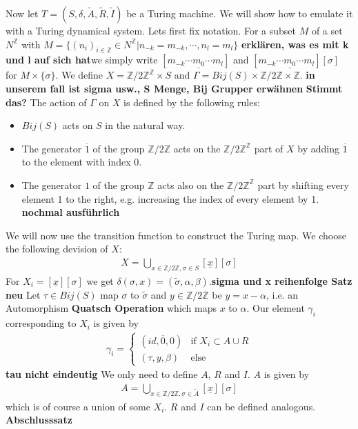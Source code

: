 \documentclass[12pt,a4paper]{scrartcl}
\numberwithin{equation}{section}
\newcommand{\Z}{\mathbb{Z}} %
\newcommand{\2}{\mathbb{Z} / 2 \mathbb{Z}}
\begin{document}
Now let  $T=(S,\delta, \tilde{A}, \tilde{R}, \tilde{I})$ be a Turing machine. We will show how to emulate it with a Turing dynamical system. Lets first fix notation. For a subset $M$ of a set $N^\Z$ with $M = \{(n_i)_{i \in \Z} \in N^\Z | n_{-k} = m_{-k}, \cdots, n_l = m_l \}$ \textbf{erklären, was es mit k und l auf sich hat}we simply write $[m_{-k} \cdots \underline{m_0} \cdots m_l]$ and $[m_{-k} \cdots \underline{m_0} \cdots m_l][\sigma]$ for $M \times \{\sigma\}$. We define $X = \2^\Z \times S$ and $\Gamma = Bij(S) \times \2 \times \Z$. \textbf{in unserem fall ist sigma usw., S Menge, Bij Grupper erwähnen}
\textbf{Stimmt das?}
The action of $\Gamma$ on $X$ is defined by the following rules:
\begin{itemize}
	\item $Bij(S)$ acts on $S$ in the natural way.
	\item The generator $\overline{1}$ of the group $\Z / 2\Z$ acts on the $\Z / 2\Z^\Z$ part of $X$ by adding $\overline{1}$ to the element with index $0$.
	\item The generator $1$ of the group $\Z$ acts also on the $\Z / 2\Z^\Z$ part by shifting every element 1 to the right, e.g. increasing the index of every element by 1. \textbf{nochmal ausführlich}
\end{itemize}
We will now use the transition function to construct the Turing map. We choose the following devision of $X$:
\begin{align*}
	X = \bigcup_{x \in \2, \sigma \in S} [\underline{x}][\sigma]
\end{align*}
For $X_i = [\underline{x}][\sigma]$ we get $\delta(\sigma, x) = (\tilde{\sigma}, \alpha, \beta)$.\textbf{sigma und x reihenfolge Satz neu} Let $\tau \in Bij(S)$ map $\sigma$ to $\tilde{\sigma}$ and $y \in \2$ be $y=x-\alpha$, i.e. an Automorphism \textbf{Quatsch Operation} which maps $x$ to $\alpha$. Our element $\gamma_i$ corresponding to $X_i$ is given by 
\begin{align*}
	\gamma_i = \begin{cases}
	(id, \overline{0}, 0) & \text{if } X_i \subset A \cup R \\
	(\tau, y, \beta) & \text{else}
	\end{cases}
\end{align*} 
\textbf{tau nicht eindeutig}
We only need to define $A$, $R$ and $I$. $A$ is given by
\begin{align*}
	A = \bigcup_{x \in \2, \sigma \in \tilde{A}}[\underline{x}][\sigma]
\end{align*}
which is of course a union of some $X_i$. $R$ and $I$ can be defined analogous. \textbf{Abschlusssatz}
\end{document}
